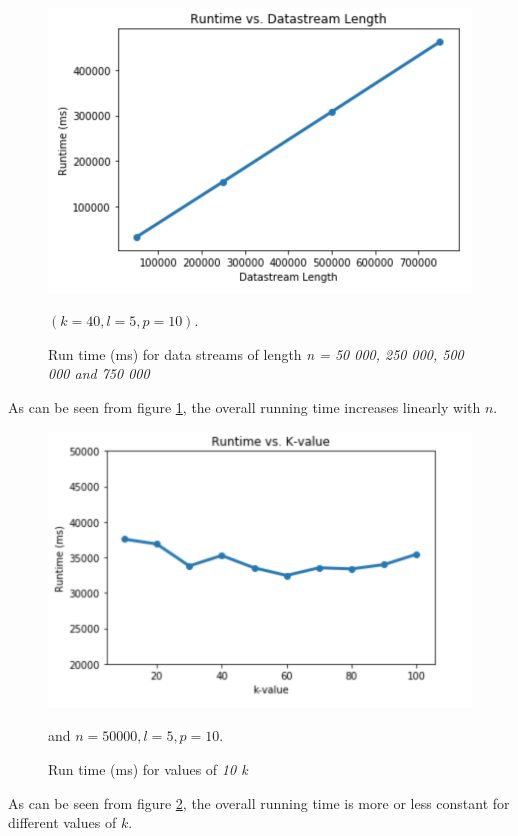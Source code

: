 \begin{figure}[H]
    \centering
    \includegraphics[scale=0.8]{Images/runtime.png}
    \caption{Run time (ms) for data streams of length \textit{n = 50 000, 250 000, 500 000 and 750 000}} $(k=40, l=5, p=10)$.
    \label{fig:runtime}
\end{figure}

\noindent As can be seen from figure \ref{fig:runtime}, the overall running time increases linearly with $n$. 


\begin{figure}[H]
    \centering
    \includegraphics[scale=0.8]{Images/runtimekvals.png}
    \caption{Run time (ms) for values of  \textit{10 \leq k }} and $n=50 000, l=5, p=10$.
    \label{fig:runtimekvals}
\end{figure}

\noindent As can be seen from figure \ref{fig:runtimekvals}, the overall running time is more or less constant for different values of $k$. 

